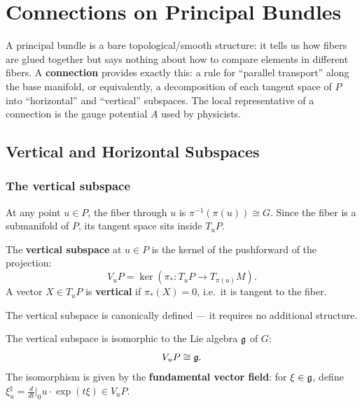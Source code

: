 \chapter{Connections on Principal Bundles}

A principal bundle is a bare topological/smooth structure: it tells us how fibers are glued together but says nothing about how to compare elements in different fibers. A \textbf{connection} provides exactly this: a rule for ``parallel transport'' along the base manifold, or equivalently, a decomposition of each tangent space of $P$ into ``horizontal'' and ``vertical'' subspaces. The local representative of a connection is the gauge potential $A$ used by physicists.

\section{Vertical and Horizontal Subspaces}

\subsection{The vertical subspace}

At any point $u \in P$, the fiber through $u$ is $\pi^{-1}(\pi(u)) \cong G$. Since the fiber is a submanifold of $P$, its tangent space sits inside $T_u P$.

\begin{definition}
The \textbf{vertical subspace} at $u \in P$ is the kernel of the pushforward of the projection:
\begin{equation}
V_u P = \ker(\pi_*: T_u P \to T_{\pi(u)}M).
\end{equation}
A vector $X \in T_u P$ is \textbf{vertical} if $\pi_*(X) = 0$, i.e.\ it is tangent to the fiber.
\end{definition}

The vertical subspace is canonically defined --- it requires no additional structure.

\begin{proposition}
The vertical subspace is isomorphic to the Lie algebra $\mathfrak{g}$ of $G$:
\begin{equation}
V_u P \cong \mathfrak{g}.
\end{equation}
The isomorphism is given by the \textbf{fundamental vector field}: for $\xi \in \mathfrak{g}$, define $\xi^\sharp_u = \frac{d}{dt}\big|_0 u \cdot \exp(t\xi) \in V_u P$.
\end{proposition}

